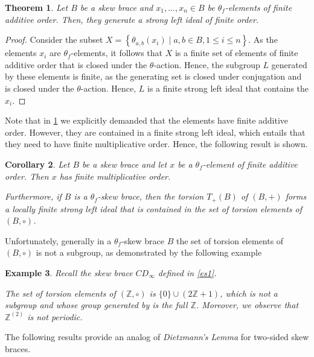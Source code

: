 \documentclass{amsart}
\newcommand{\Z}{\mathbb{Z}}
\newtheorem{thm}{Theorem}[section]
\newtheorem{cor}[thm]{Corollary}
\newtheorem{exa}[thm]{Example}
\begin{document}
\begin{thm}\label{dietz}
    Let $B$ be a skew brace and $x_1,...,x_n \in B$ be $\theta_f$-elements of finite additive order. Then, they generate a strong left ideal of finite order. 
\end{thm}
\begin{proof}
    Consider the subset $X = \left\lbrace \theta_{a,b}(x_i) \mid a,b \in B, 1 \leq i \leq n\right\rbrace$. As the elements $x_i$ are $\theta_f$-elements, it follows that $X$ is a finite set of elements of finite additive order that is closed under the $\theta$-action. Hence, the subgroup $L$ generated by these elements is finite, as the generating set is closed under conjugation and is closed under the $\theta$-action. Hence, $L$ is a finite strong left ideal that contains the $x_i$. 
\end{proof}

Note that in \cref{dietz} we explicitly demanded that the elements have finite additive order. However, they are contained in a finite strong left ideal, which entails that they need to have finite multiplicative order. Hence, the following result is shown.
\begin{cor}
\label{Dietzmann cor}
    Let $B$ be a skew brace and let $x$ be a $\theta_f$-element of finite additive order. Then $x$ has finite multiplicative order.

    Furthermore, if $B$ is a $\theta_f$-skew brace, then the torsion $T_+(B)$ of $(B,+)$ forms a locally finite strong left ideal that is contained in the set of torsion elements of $(B,\circ)$.
\end{cor}

Unfortunately, generally in a $\theta_f$-skew brace $B$ the set of  torsion elements of $(B,\circ)$ is not a subgroup, as demonstrated by the following example

\begin{exa}
Recall the skew brace $CD_{\infty}$ defined in \cref{es1}.


The set of torsion elements of $(\Z,\circ)$ is $\{0\}\cup (2\Z+1)$, which is not a subgroup and whose group generated by is the full $\Z$. Moreover, we observe that $\Z^{(2)}$ is not periodic.

\end{exa}

The following results provide an analog of \textit{Dietzmann's Lemma} for two-sided skew braces.
\end{document}
